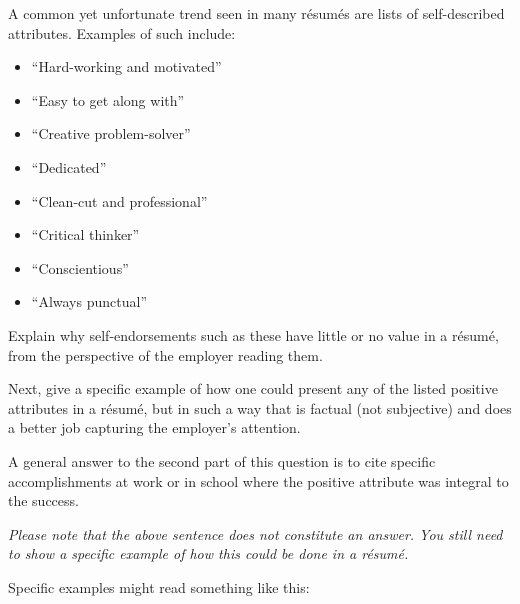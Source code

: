 

A common yet unfortunate trend seen in many r\'esum\'es are lists of self-described attributes.  Examples of such include:

\begin{itemize}
\item{} ``Hard-working and motivated''
\item{} ``Easy to get along with''
\item{} ``Creative problem-solver''
\item{} ``Dedicated''
\item{} ``Clean-cut and professional''
\item{} ``Critical thinker''
\item{} ``Conscientious''
\item{} ``Always punctual''
\end{itemize}

Explain why self-endorsements such as these have little or no value in a r\'esum\'e, from the perspective of the employer reading them.

\vskip 50pt

Next, give a specific example of how one could present any of the listed positive attributes in a r\'esum\'e, but in such a way that is factual (not subjective) and does a better job capturing the employer's attention.

\vskip 50pt







A general answer to the second part of this question is to cite specific accomplishments at work or in school where the positive attribute was integral to the success.

\vskip 10pt

{\it Please note that the above sentence does not constitute an answer.  You still need to show a specific example of how this could be done in a r\'esum\'e.}







Specific examples might read something like this:

